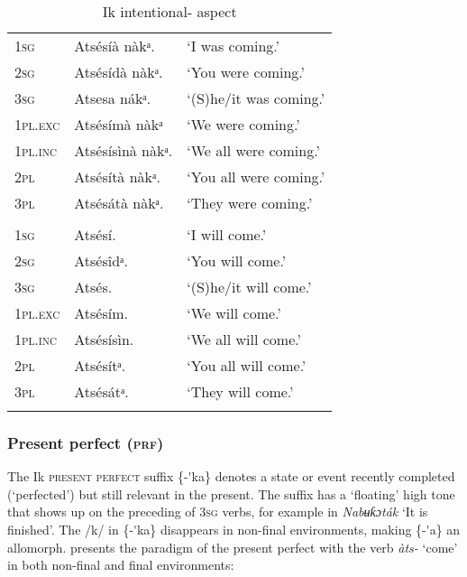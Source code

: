\begin{table}
\caption{Ik intentional- aspect}
\label{tab:verbs:int}


\begin{tabularx}{\textwidth}{XXX}
\lsptoprule

\multicolumn{2}{X}{Imperfective} & \\
\midrule
\textsc{1sg} & Atsésíà nàkᵃ. & ‘I was coming.’\\
\textsc{2sg} & Atsésídà nàkᵃ. & ‘You were coming.’\\
\textsc{3sg} & Atsesa nákᵃ. & ‘(S)he/it was coming.’\\
\textsc{1pl.exc} & Atsésímà nàkᵃ & ‘We were coming.’\\
\textsc{1pl.inc} & Atsésísìnà nàkᵃ. & ‘We all were coming.’\\
\textsc{2pl} & Atsésítà nàkᵃ. & ‘You all were coming.’\\
\textsc{3pl} & Atsésátà nàkᵃ. & ‘They were coming.’\\
\tablevspace
\multicolumn{2}{X}{Intentional} & \\
\midrule
\textsc{1sg} & Atsésí. & ‘I will come.’\\
\textsc{2sg} & Atsésîdᵃ. & ‘You will come.’\\
\textsc{3sg} & Atsés. & ‘(S)he/it will come.’\\
\textsc{1pl.exc} & Atsésím. & ‘We will come.’\\
\textsc{1pl.inc} & Atsésísìn. & ‘We all will come.’\\
\textsc{2pl} & Atsésítᵃ. & ‘You all will come.’\\
\textsc{3pl} & Atsésátᵃ. & ‘They will come.’\\
\lspbottomrule
\end{tabularx}
\end{table}

\subsubsection{Present perfect (\textsc{prf})}\label{sec:8.10.2}

The Ik \textsc{present perfect} suffix \{-\'{}ka\} denotes a state or event recently completed (‘perfected’) but still relevant in the present. The suffix has a ‘floating’ high tone that shows up on the preceding  of 3\textsc{sg} verbs, for example in \textit{Nabʉƙɔták\ᵃ} ‘It is finished’. The /k/ in \{-\'{}ka\} disappears in non-final environments, making \{-\'{}a\} an allomorph.  presents the paradigm of the present perfect with the verb \textit{àts-} ‘come’ in both non-final and final environments:


